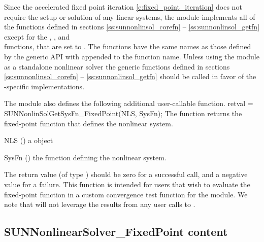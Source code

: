 Since the accelerated fixed point iteration
\eqref{e:fixed_point_iteration} does not require the setup or solution
of any linear systems, the {\sunnonlinsolfixedpoint} module implements
all of the functions defined in sections \ref{ss:sunnonlinsol_corefn} --
\ref{ss:sunnonlinsol_getfn} except for the ,
, and \\ \noindent
{} functions, that are set to .
The {\sunnonlinsolfixedpoint} functions have the same names as those
defined by the generic {\sunnonlinsol} API with 
appended to the function name.  Unless using the
{\sunnonlinsolfixedpoint} module as a standalone nonlinear solver the
generic functions defined in sections \ref{ss:sunnonlinsol_corefn} --
\ref{ss:sunnonlinsol_getfn} should be called in favor of the
{\sunnonlinsolfixedpoint}-specific implementations. 

The {\sunnonlinsolfixedpoint} module also defines the following additional
user-callable function.
{
  retval = SUNNonlinSolGetSysFn\_FixedPoint(NLS, SysFn);
}
{
  The function  returns the fixed-point
  function that defines the nonlinear system.
}
{
  \begin{args}[SysFn]
  \item[NLS] ()
    a {\sunnonlinsol} object
  \item[SysFn] ()
    the function defining the nonlinear system.
  \end{args}
}
{
  The return value  (of type ) should be zero for a
  successful call, and a negative value for a failure.
}
{
  This function is intended for users that wish to evaluate the
  fixed-point function in a custom convergence test function for the
  {\sunnonlinsolfixedpoint} module. We note that {\sunnonlinsolfixedpoint}
  will not leverage the results from any user calls to .
}


\subsection{SUNNonlinearSolver\_FixedPoint content}
\label{ss:sunnonlinsolfixedpoint_content}

